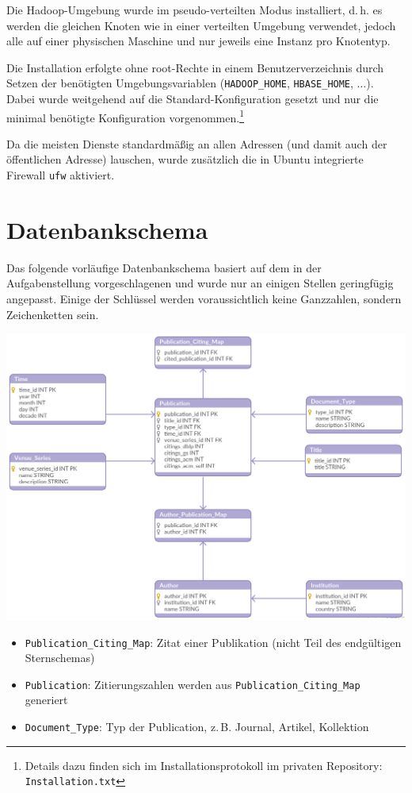 \documentclass[a4paper,11pt,utf8]{scrartcl}
\begin{document}
Die Hadoop-Umgebung wurde im pseudo-verteilten Modus installiert, d.\,h. es werden die gleichen Knoten wie in einer verteilten Umgebung verwendet, jedoch alle auf einer physischen Maschine und nur jeweils eine Instanz pro Knotentyp.

Die Installation erfolgte ohne root-Rechte in einem Benutzerverzeichnis durch Setzen der benötigten Umgebungsvariablen (\texttt{HADOOP\_HOME}, \texttt{HBASE\_HOME}, $\dots$). Dabei wurde weitgehend auf die Standard-Konfiguration gesetzt und nur die minimal benötigte Konfiguration vorgenommen.\footnote{Details dazu finden sich im Installationsprotokoll im privaten Repository: \texttt{Installation.txt}}

Da die meisten Dienste standardmäßig an allen Adressen (und damit auch der öffentlichen Adresse) lauschen, wurde zusätzlich die in Ubuntu integrierte Firewall \texttt{ufw} aktiviert.

\section{Datenbankschema}

Das folgende vorläufige Datenbankschema basiert auf dem in der Aufgabenstellung vorgeschlagenen und wurde nur an einigen Stellen geringfügig angepasst. Einige der Schlüssel werden voraussichtlich keine Ganzzahlen, sondern Zeichenketten sein.

\noindent
\includegraphics[width=\textwidth]{pics/schema.png}

\begin{itemize}
    \item \texttt{Publication\_Citing\_Map}: Zitat einer Publikation (nicht Teil des endgültigen Sternschemas)
    \item \texttt{Publication}: Zitierungszahlen werden aus \texttt{Publication\_Citing\_Map} generiert
    \item \texttt{Document\_Type}: Typ der Publication, z.\,B. Journal, Artikel, Kollektion
\end{itemize}
\end{document}
